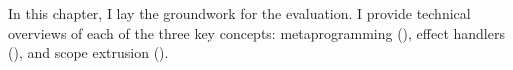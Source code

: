 In this chapter, I lay the groundwork for the evaluation. I provide technical overviews of each of the three key concepts: metaprogramming (), effect handlers (), and scope extrusion ().
